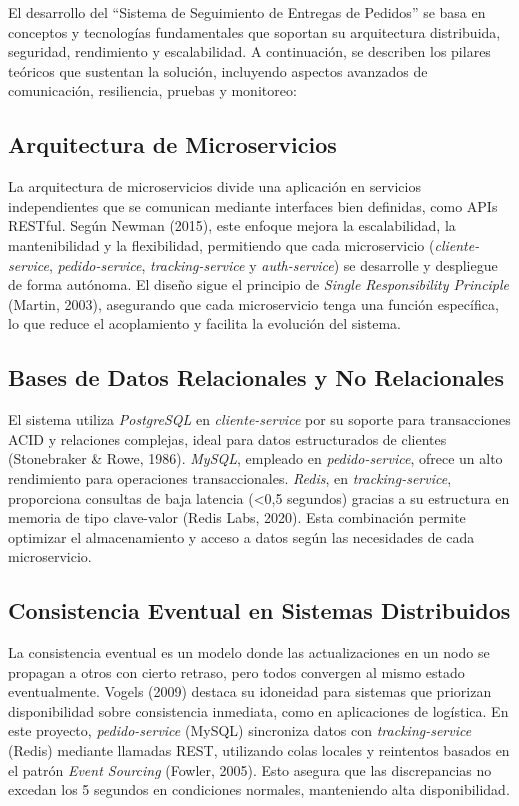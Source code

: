 \documentclass[a4paper,12pt]{article}
\begin{document}
El desarrollo del ``Sistema de Seguimiento de Entregas de Pedidos'' se basa en conceptos y tecnologías fundamentales que soportan su arquitectura distribuida, seguridad, rendimiento y escalabilidad. A continuación, se describen los pilares teóricos que sustentan la solución, incluyendo aspectos avanzados de comunicación, resiliencia, pruebas y monitoreo:

\subsection{Arquitectura de Microservicios}
La arquitectura de microservicios divide una aplicación en servicios independientes que se comunican mediante interfaces bien definidas, como APIs RESTful. Según Newman (2015), este enfoque mejora la escalabilidad, la mantenibilidad y la flexibilidad, permitiendo que cada microservicio (\textit{cliente-service}, \textit{pedido-service}, \textit{tracking-service} y \textit{auth-service}) se desarrolle y despliegue de forma autónoma. El diseño sigue el principio de \textit{Single Responsibility Principle} (Martin, 2003), asegurando que cada microservicio tenga una función específica, lo que reduce el acoplamiento y facilita la evolución del sistema.

\subsection{Bases de Datos Relacionales y No Relacionales}
El sistema utiliza \textit{PostgreSQL} en \textit{cliente-service} por su soporte para transacciones ACID y relaciones complejas, ideal para datos estructurados de clientes (Stonebraker \& Rowe, 1986). \textit{MySQL}, empleado en \textit{pedido-service}, ofrece un alto rendimiento para operaciones transaccionales. \textit{Redis}, en \textit{tracking-service}, proporciona consultas de baja latencia (<0,5 segundos) gracias a su estructura en memoria de tipo clave-valor (Redis Labs, 2020). Esta combinación permite optimizar el almacenamiento y acceso a datos según las necesidades de cada microservicio.

\subsection{Consistencia Eventual en Sistemas Distribuidos}
La consistencia eventual es un modelo donde las actualizaciones en un nodo se propagan a otros con cierto retraso, pero todos convergen al mismo estado eventualmente. Vogels (2009) destaca su idoneidad para sistemas que priorizan disponibilidad sobre consistencia inmediata, como en aplicaciones de logística. En este proyecto, \textit{pedido-service} (MySQL) sincroniza datos con \textit{tracking-service} (Redis) mediante llamadas REST, utilizando colas locales y reintentos basados en el patrón \textit{Event Sourcing} (Fowler, 2005). Esto asegura que las discrepancias no excedan los 5 segundos en condiciones normales, manteniendo alta disponibilidad.
\end{document}
